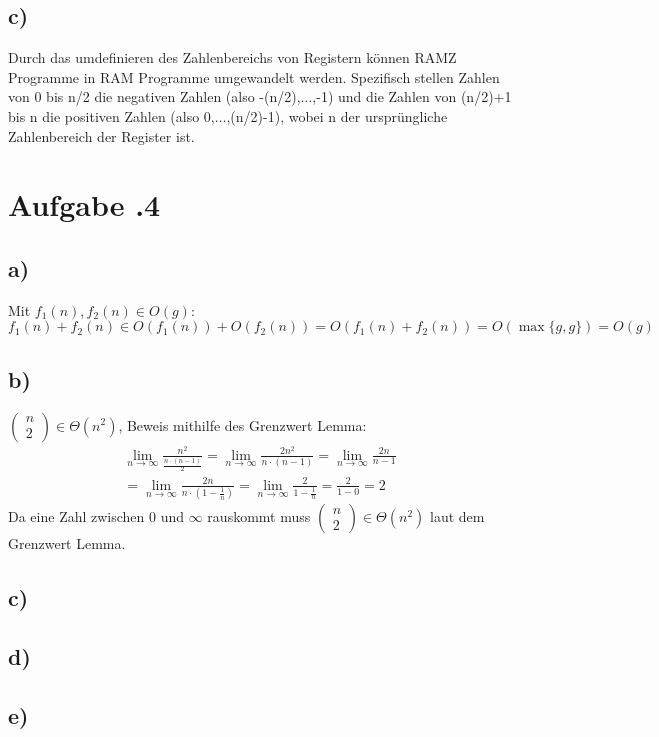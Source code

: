 \documentclass[12pt,german,a4paper]{article}
\begin{document}
	\subsection*{c)}
	Durch das umdefinieren des Zahlenbereichs von Registern können RAMZ Programme in RAM Programme umgewandelt werden. Spezifisch stellen Zahlen von 0 bis n/2 die negativen Zahlen (also -(n/2),$ \ldots $,-1) und die Zahlen von (n/2)+1 bis n die positiven Zahlen (also 0,$ \ldots $,(n/2)-1), wobei n der ursprüngliche Zahlenbereich der Register ist.
  \newpage

	\section*{Aufgabe \bn.4}
	\subsection*{a)}
	Mit $f_1(n),f_2(n)\in O(g)$:
	\[ f_1(n)+f_2(n) \in O(f_1(n)) + O(f_2(n))=O(f_1(n)+f_2(n))=O(\max\{g,g\})=O(g)\]

	\subsection*{b)}
	$\begin{pmatrix}n\\2\end{pmatrix}\in\Theta(n^2)$, Beweis mithilfe des Grenzwert Lemma:
	\begin{align*}
	\lim _{ n \rightarrow \infty }  \frac{ n^2 }{ \frac{ n\cdot(n-1) }{ 2 } } = \lim _{ n \rightarrow \infty }\frac{ 2n^2 }{ n\cdot(n-1) } =\lim _{ n \rightarrow \infty }\frac{ 2n }{ n-1 } \\
	=\lim _{ n \rightarrow \infty }\frac{ 2n }{ n\cdot(1-\frac{ 1 }{ n } ) } =\lim _{ n \rightarrow \infty }\frac{ 2 }{ 1-\frac{ 1 }{ n }  } = \frac{ 2 }{ 1-0 } = 2
	\end{align*}
	Da eine Zahl zwischen 0 und $\infty$ rauskommt muss $\begin{pmatrix}n\\2\end{pmatrix}\in\Theta(n^2)$ laut dem Grenzwert Lemma.

	\subsection*{c)}
	\subsection*{d)}
	\subsection*{e)}
\end{document}

